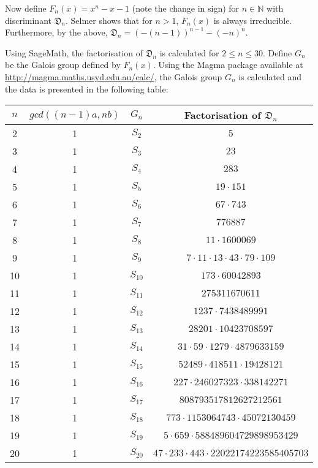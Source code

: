 \documentclass[12pt]{extarticle}
\newcommand{\N}{\mathbb{N}}
\newcommand{\<}{\langle}
\renewcommand{\>}{\rangle}
\theoremstyle{definition}
\begin{document}
Now define $F_n(x) = x^n-x-1$ (note the change in sign) for $ n \in \N$ with discriminant $\mathfrak{D}_n$. Selmer \cite{SELMER} shows that for $n>1$, $F_n(x)$ is always irreducible. Furthermore, by the above, $\mathfrak{D}_n= (-(n-1))^{n-1} - (-n)^{n}$. \par 
Using SageMath, the factorisation of $\mathfrak{D}_n$ is calculated for $2 \leq n \leq 30$. Define $G_n$ be the Galois group defined by $F_n(x)$. Using the Magma package available at \url{http://magma.maths.usyd.edu.au/calc/}, the Galois group $G_n$ is calculated and the data is presented in the following table:
\begin{center}
 \begin{tabular}{||c | c | c | c||} 
 \hline
 $n$ & $gcd((n-1)a,nb)$ & $G_n$ & Factorisation of $\mathfrak{D}_n$ \\ [0.5ex] 
 \hline\hline
2 & 1 & $S_{2}$ & $5$ \\
\hline
3 & 1 & $S_{3}$ & $23$ \\
\hline
4 & 1 & $S_{4}$ & $283$ \\
\hline
5 & 1 & $S_{5}$ & $19 \cdot 151$ \\
\hline
6 & 1 & $S_{6}$ & $67 \cdot 743$ \\
\hline
7 & 1 & $S_{7}$ & $776887$ \\
\hline
8 & 1 & $S_{8}$ & $11 \cdot 1600069$ \\
\hline
9 & 1 & $S_{9}$ & $7 \cdot 11 \cdot 13 \cdot 43 \cdot 79 \cdot 109$ \\
\hline
10 & 1 & $S_{10}$ & $173 \cdot 60042893$ \\
\hline
11 & 1 & $S_{11}$ & $275311670611$ \\
\hline
12 & 1 & $S_{12}$ & $1237 \cdot 7438489991$ \\
\hline
13 & 1 & $S_{13}$ & $28201 \cdot 10423708597$ \\
\hline
14 & 1 & $S_{14}$ & $31 \cdot 59 \cdot 1279 \cdot 4879633159$ \\
\hline
15 & 1 & $S_{15}$ & $52489 \cdot 418511 \cdot 19428121$ \\
\hline
16 & 1 & $S_{16}$ & $227 \cdot 246027323 \cdot 338142271$ \\
\hline
17 & 1 & $S_{17}$ & $808793517812627212561$ \\
\hline
18 & 1 & $S_{18}$ & $773 \cdot 1153064743 \cdot 45072130459$ \\
\hline
19 & 1 & $S_{19}$ & $5 \cdot 659 \cdot 588489604729898953429$ \\
\hline
20 & 1 & $S_{20}$ & $47 \cdot 233 \cdot 443 \cdot 22022174223585405703$ \\

\end{tabular}
\end{center}
\end{document}
